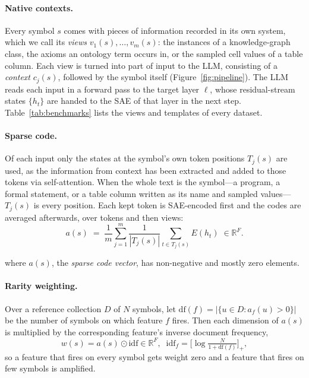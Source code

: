 \documentclass[11pt]{article}
\newcommand{\R}{\mathbb{R}}
\newcommand{\idf}{\mathrm{idf}}
\newcommand{\df}{\mathrm{df}}
\begin{document}
\paragraph{Native contexts.}
Every symbol $s$ comes with pieces of information recorded in its own system, which we call its \emph{views} $v_1(s),\dots,v_m(s)$: the instances of a knowledge-graph class, the axioms an ontology term occurs in, or the sampled cell values of a table column.
Each view is turned into part of input to the LLM, consisting of a \emph{context} $c_j(s)$, followed by the symbol itself (Figure~\ref{fig:pipeline}).
The LLM reads each input in a forward pass to the target layer $\ell$, whose residual-stream states $\{h_t\}$ are handed to the SAE of that layer in the next step.
Table~\ref{tab:benchmarks} lists the views and templates of every dataset.

\paragraph{Sparse code.}
Of each input only the states at the symbol's own token positions $T_j(s)$ are used, as the information from context has been extracted and added to those tokens via self-attention. When the whole text is the symbol---a program, a formal statement, or a table column written as its name and sampled values---$T_j(s)$ is every position.
Each kept token is SAE-encoded first and the codes are averaged afterwards, over tokens and then views:
\begin{equation}
  a(s) \;=\; \frac{1}{m}\sum_{j=1}^{m}\frac{1}{|T_j(s)|}\sum_{t\in T_j(s)} E(h_t)\;\in\R^{F}.
  \label{eq:code}
\end{equation}

where $a(s)$, the \emph{sparse code vector}, has non-negative and mostly zero elements. 

\paragraph{Rarity weighting.}
Over a reference collection $D$ of $N$ symbols, let $\df(f)=|\{u\in D : a_f(u)>0\}|$ be the number of symbols on which feature $f$ fires.
Then each dimension of $a(s)$ is multiplied by the corresponding feature's inverse document frequency,
\begin{equation}
  w(s) = a(s)\odot\idf\in\R^F,\;\; \idf_f=\Big[\log\tfrac{N}{1+\df(f)}\Big]_+ ,
  \label{eq:idf}
\end{equation}
so a feature that fires on every symbol gets weight zero and a feature that fires on few symbols is amplified.
\end{document}
